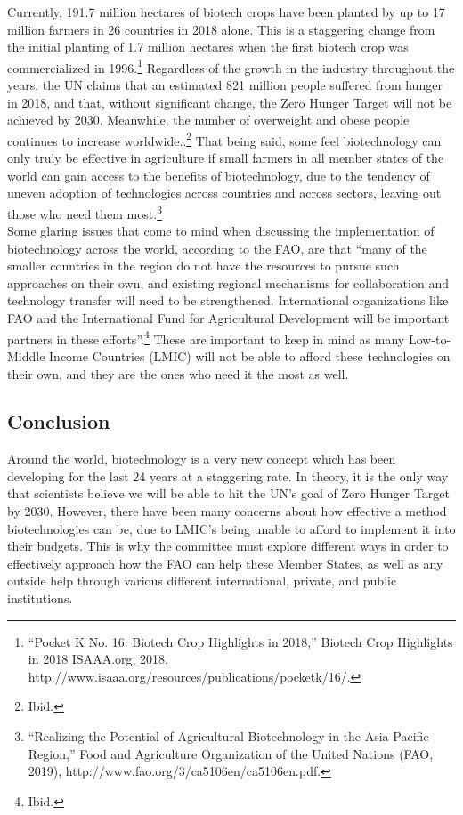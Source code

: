 \documentclass[10pt, letterpaper]{article}
\begin{document}
Currently, 191.7 million hectares of biotech crops have been planted by
up to 17 million farmers in 26 countries in 2018 alone. This is a
staggering change from the initial planting of 1.7 million hectares when
the first biotech crop was commercialized in 1996.\footnote{``Pocket K
  No. 16: Biotech Crop Highlights in 2018,'' Biotech Crop Highlights in
  2018 ISAAA.org, 2018,
  http://www.isaaa.org/resources/publications/pocketk/16/.} Regardless
of the growth in the industry throughout the years, the UN claims that
an estimated 821 million people suffered from hunger in 2018, and that,
without significant change, the Zero Hunger Target will not be achieved
by 2030. Meanwhile, the number of overweight and obese people continues
to increase worldwide..\footnote{Ibid.} That being said, some feel
biotechnology can only truly be effective in agriculture if small
farmers in all member states of the world can gain access to the
benefits of biotechnology, due to the tendency of uneven adoption of
technologies across countries and across sectors, leaving out those who
need them most.\footnote{``Realizing the Potential of Agricultural
  Biotechnology in the Asia-Pacific Region,'' Food and Agriculture
  Organization of the United Nations (FAO, 2019),
  http://www.fao.org/3/ca5106en/ca5106en.pdf.} \\

Some glaring issues that come to mind when discussing the implementation
of biotechnology across the world, according to the FAO, are that ``many
of the smaller countries in the region do not have the resources to
pursue such approaches on their own, and existing regional mechanisms
for collaboration and technology transfer will need to be strengthened.
International organizations like FAO and the International Fund for
Agricultural Development will be important partners in these
efforts''.\footnote{Ibid.} These are important to keep in mind as many
Low-to-Middle Income Countries (LMIC) will not be able to afford these
technologies on their own, and they are the ones who need it the most as
well. \\

\subsection{Conclusion}

Around the world, biotechnology is a very new concept which has been
developing for the last 24 years at a staggering rate. In theory, it is
the only way that scientists believe we will be able to hit the UN's
goal of Zero Hunger Target by 2030. However, there have been many
concerns about how effective a method biotechnologies can be, due to
LMIC's being unable to afford to implement it into their budgets. This
is why the committee must explore different ways in order to effectively
approach how the FAO can help these Member States, as well as any
outside help through various different international, private, and
public institutions. \\
\end{document}
